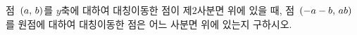점~$(a,\mkern3mu b)$를 $y$축에 대하여 대칭이동한 점이 제$2$사분면 위에 있을 때, 점~$(-a-b,\mkern3mu ab)$를 원점에 대하여 대칭이동한 점은 어느 사분면 위에 있는지 구하시오.

